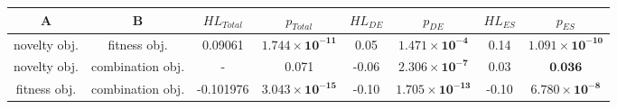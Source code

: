\begin{tabular}{cccccccc}
\toprule
           A &                B & ${HL}_{Total}$ &                      $p_{Total}$ & ${HL}_{DE}$ &                         $p_{DE}$ & ${HL}_{ES}$ &                         $p_{ES}$ \\
\midrule
novelty obj. &     fitness obj. &        0.09061 & $\mathbf{1.744 \times 10^{-11}}$ &        0.05 &  $\mathbf{1.471 \times 10^{-4}}$ &        0.14 & $\mathbf{1.091 \times 10^{-10}}$ \\
novelty obj. & combination obj. &              - &                            0.071 &       -0.06 &  $\mathbf{2.306 \times 10^{-7}}$ &        0.03 &                 $\textbf{0.036}$ \\
fitness obj. & combination obj. &      -0.101976 & $\mathbf{3.043 \times 10^{-15}}$ &       -0.10 & $\mathbf{1.705 \times 10^{-13}}$ &       -0.10 &  $\mathbf{6.780 \times 10^{-8}}$ \\
\bottomrule
\end{tabular}
